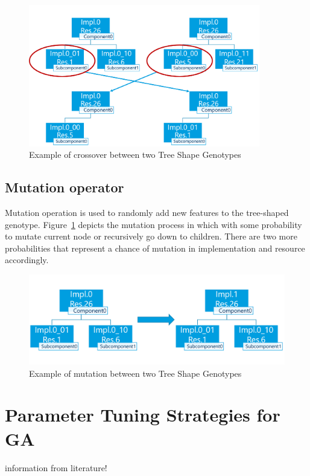 \begin{figure}
	\centering
	\includegraphics[width=0.9\textwidth]{images/GeneticSolverCrossover.png}
	\caption[Crossover in Tree Shape Genotype]{Example of crossover between two Tree Shape Genotypes}
	\label{fig:GeneticSolverCrossover}
\end{figure}



\subsection{Mutation operator}
Mutation operation is used to randomly add new features to the tree-shaped genotype. Figure~\ref{fig:GeneticSolverCrossover} depicts the mutation process in which with some probability to mutate current node or recursively go down to children.
There are two more probabilities that represent a chance of mutation in implementation and resource accordingly. 

\begin{figure}
	\centering
	\includegraphics[width=\textwidth]{images/GeneticSolverMutation.png}
	\caption[Mutation in Tree Shape Genotype]{Example of mutation between two Tree Shape Genotypes}
	\label{fig:GeneticSolverMutation}
\end{figure}

\section{Parameter Tuning Strategies for GA}
information from literature!


